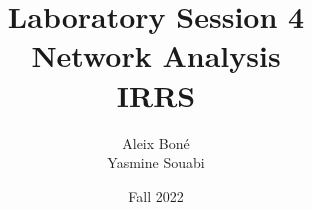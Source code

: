 


\usepackage{tikz}
\usetikzlibrary{positioning}
\usepackage{pgfplots}
\pgfplotsset{compat=1.18}

\usepackage[separate-uncertainty]{siunitx}

\usepackage{fancyvrb}
\usepackage{tabularray}
\usepackage{fancyhdr}



\makeatletter
\g@addto@macro\@floatboxreset\centering
\makeatother




\renewcommand\and{\\[\baselineskip]}

\title{\Huge Laboratory Session 4 \\ Network Analysis \\[1em]
\Large IRRS}
\author{Aleix Boné \and Yasmine Souabi}
\date{Fall 2022}







\setlength{\parskip}{1em plus 0.5em minus 0.2em}





